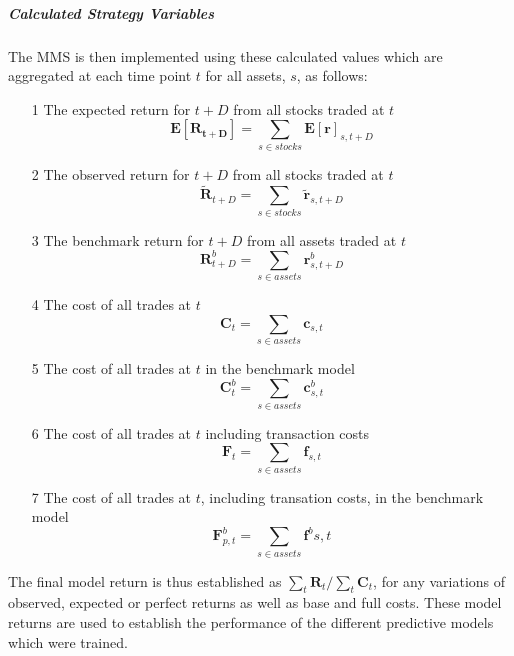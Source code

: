 \documentclass[a4paper,11pt,oneside]{article}
\theoremstyle{plain}
\theoremstyle{definition}
\begin{document}
	\hfill\break
	
	\subparagraph{Calculated Strategy Variables} The MMS  is then implemented using these calculated values which are aggregated at each time point $t$ for all assets, $s$, as follows:
	
	\begin{itemize}
		\item [1] The expected return for $t+D$ from all stocks traded at $t$
		\begin{equation}
		\mathbf{E[R_{{t+D}}]} = \sum_{s \in stocks} \mathbf{E[r]}_{s, {t+D}}
		\end{equation}
		\item [2] The observed return for $t+D$ from all stocks traded at $t$
		\begin{equation}
		\mathbf{\tilde{R}}_{{t+D}} = \sum_{s \in stocks} \mathbf{\tilde{r}}_{s, {t+D}}
		\end{equation}
		\item [3] The benchmark return for $t+D$ from all assets traded at $t$
		\begin{equation}
		\mathbf{R}^b_{{t+D}} = \sum_{s \in assets} \mathbf{r}^b_{s, {t+D}}
		\end{equation}
		\item [4] The cost of all trades at $t$
		\begin{equation}
		\mathbf{C}_t = \sum_{s \in assets} \mathbf{c}_{s,t}
		\end{equation}
		\item [5] The cost of all trades at $t$ in the benchmark model
		\begin{equation}
		\mathbf{C}^b_{t} = \sum_{s \in assets} \mathbf{c}^b_{s ,t}
		\end{equation}
		\item [6] The cost of all trades at $t$ including transaction costs
		\begin{equation}
		\mathbf{F}_t = \sum_{s \in assets} \mathbf{f}_{s,t}
		\end{equation}
		\item [7] The cost of all trades at $t$, including transation costs, in the benchmark model	
		\begin{equation}
		\mathbf{F}^b_{p,t} = \sum_{s \in assets} \mathbf{f}^b{s,t}
		\end{equation}	
	\end{itemize}
	\hfill\break
	The final model return is thus established as $\sum_t{\mathbf{R}_t} / \sum_t{\mathbf{C}_t} $, for any variations of observed, expected or perfect returns as well as base and full costs. These model returns are used to establish the performance of the different predictive models which were trained.\newline
	\hfill\break
	
\end{document}
